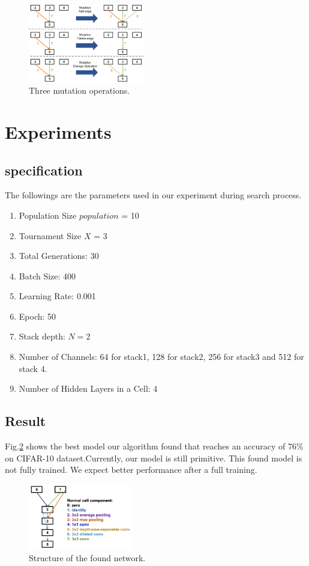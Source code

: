 \documentclass[conference]{IEEEtran}
\begin{document}
\begin{figure}[H]
	\centering
	\includegraphics[width=0.45\textwidth]{figures/mutation.png}
	\caption{Three mutation operations.}\label{fig:digit}
	\label{mutation}
\end{figure}


 \section{Experiments}

 \subsection{specification}
 The followings are the parameters used in our experiment during search process.
 \begin{enumerate}
  \item Population Size $population$ = 10
  \item Tournament Size $X$ = 3
  \item Total Generations: 30
  \item Batch Size: 400
  \item Learning Rate: 0.001
  \item Epoch: 50
  \item Stack depth: $N = 2$
  \item Number of Channels: 64 for stack1, 128 for stack2, 256 for stack3 and 512 for stack 4.
  \item Number of Hidden Layers in a Cell: 4
 \end{enumerate}

 \subsection{Result}

 Fig.\ref{found_artc} shows the best model our algorithm found that reaches an accuracy of 76\% on CIFAR-10 dataset.Currently, our model is still primitive. This found model is not fully trained. We expect better performance after a full training.

\begin{figure}[H]
 	\centering
 	\includegraphics[width=0.4\textwidth]{figures/newResult.png}
   \caption{Structure of the found network. }\label{fig:digit}
   \label{found_artc}
  \end{figure}
\end{document}
